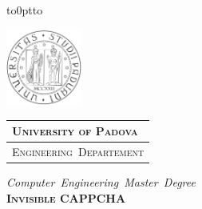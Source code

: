 \documentclass[a4paper, 12pt, twoside, openright]{book}
\begin{document}
\frontmatter

\begin{titlepage} %
\begin{center}
\vbox to0pt{\vbox to\vss}

\begin{minipage}{.20\textwidth}
  \includegraphics[height=2.5cm]{./Images/unipd-bn}
\end{minipage}\begin{minipage}{.90\textwidth}
  \begin{table}[H]
  \begin{tabular}{l}
  \scshape{\Large{\bfseries{University of Padova}}} \\
  \hline
  \scshape{\Large{Engineering~Departement}} \\
  \end{tabular}
  \end{table}
\end{minipage}

\vspace{1cm}
\emph{\Large{Computer~Engineering~Master~Degree}} \\
\vspace{1.5cm}
\scshape{\Large{\bfseries{Invisible CAPPCHA}}} \\
\vspace{0.2cm} \linespread{1} 
\scshape{\large{\bfseries{}}}
\end{center}


\end{titlepage}
\end{document}
